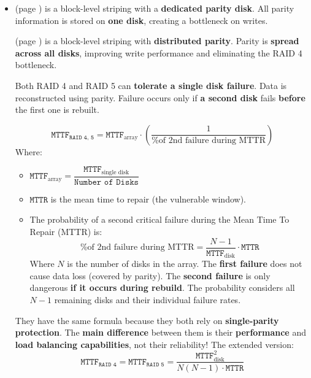 \begin{itemize}
\begin{itemize}
        \item {} (page ) is a block-level striping with a \textbf{dedicated parity disk}. All parity information is stored on \textbf{one disk}, creating a bottleneck on writes.
        
         (page ) is a block-level striping with \textbf{distributed parity}. Parity is \textbf{spread across all disks}, improving write performance and eliminating the RAID 4 bottleneck.

        Both RAID 4 and RAID 5 can \textbf{tolerate a single disk failure}. Data is reconstructed using parity. Failure occurs only if \textbf{a second disk} fails \textbf{before} the first one is rebuilt.
        
        \begin{equation}
            \texttt{MTTF}_{\texttt{RAID 4, 5}} = \texttt{MTTF}_{\text{array}} \cdot \left(
                \dfrac{1}{\text{\% of 2nd failure during MTTR}}
            \right)
        \end{equation}
        Where:
        \begin{itemize}
            \item $\texttt{MTTF}_{\text{array}} = \dfrac{\texttt{MTTF}_{\text{single disk}}}{\texttt{Number of Disks}}$
            \item $\texttt{MTTR}$ is the mean time to repair (the vulnerable window).
            \item The probability of a second critical failure during the Mean Time To Repair (MTTR) is:
            \begin{equation}
                \text{\% of 2nd failure during MTTR} = \dfrac{N - 1}{\texttt{MTTF}_{\text{disk}}} \cdot \texttt{MTTR}
            \end{equation}
            Where $N$ is the number of disks in the array. The \textbf{first failure} does not cause data loss (covered by parity). The \textbf{second failure} is only dangerous \textbf{if it occurs during rebuild}. The probability considers all $N - 1$ remaining disks and their individual failure rates.
        \end{itemize}
        They have the same formula because they both rely on \textbf{single-parity protection}. The \textbf{main difference} between them is their \textbf{performance} and \textbf{load balancing capabilities}, not their reliability! The extended version:
        \begin{equation}\label{eq: RAID 4 - 5 - MTTF}
            \texttt{MTTF}_{\texttt{RAID 4}} = \texttt{MTTF}_{\texttt{RAID 5}} = \dfrac{\texttt{MTTF}_{\text{disk}}^{2}}{N \left(N-1\right) \cdot \texttt{MTTR}}
        \end{equation}



\end{itemize}
\end{itemize}
